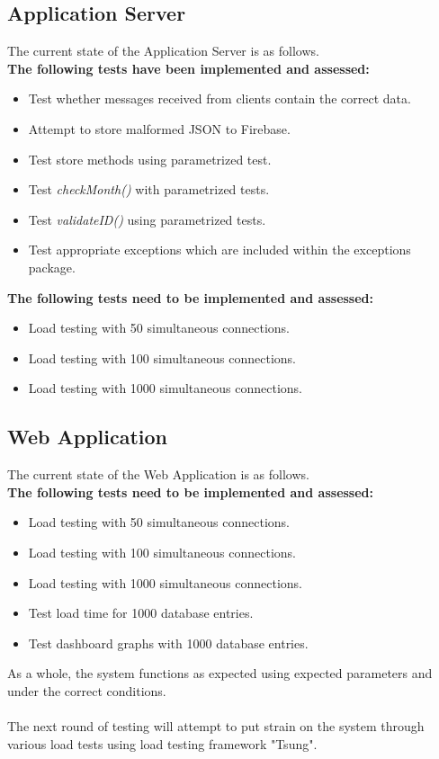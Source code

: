 \documentclass[a4paper,10pt]{article}
\begin{document}
	\subsection{Application Server}
	The current state of the Application Server is as follows.
	\textbf{\\The following tests have been implemented and assessed:}
	\begin{itemize}
		\item Test whether messages received from clients contain the correct data.
		\item Attempt to store malformed JSON to Firebase.
		\item Test store methods using parametrized test.
		\item Test \textit{checkMonth()} with parametrized tests.
		\item Test \textit{validateID()} using parametrized tests.
		\item Test appropriate exceptions which are included within the exceptions package.
	\end{itemize}
	
	\textbf{The following tests need to be implemented and assessed:}
	\begin{itemize}
		\item Load testing with 50 simultaneous connections.
		\item Load testing with 100 simultaneous connections.
		\item Load testing with 1000 simultaneous connections.
	\end{itemize}
	
	\subsection{Web Application}
	The current state of the Web Application is as follows.
	\textbf{\\The following tests need to be implemented and assessed:}
	\begin{itemize}
		\item Load testing with 50 simultaneous connections.
		\item Load testing with 100 simultaneous connections.
		\item Load testing with 1000 simultaneous connections.
		\item Test load time for 1000 database entries.
		\item Test dashboard graphs with 1000 database entries.
	\end{itemize}
	
	As a whole, the system functions as expected using expected parameters and under the correct conditions.\\\\The next round of testing will attempt to put strain on the system through various load tests using load testing framework "Tsung".
	
\end{document}
